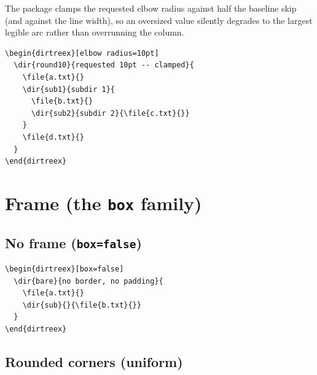 \documentclass[11pt]{article}
\begin{document}
The package clamps the requested elbow radius against half the baseline skip (and against the line width), so an oversized value silently degrades to the largest legible arc rather than overrunning the column.

\begin{Verbatim}
\begin{dirtreex}[elbow radius=10pt]
  \dir{round10}{requested 10pt -- clamped}{
    \file{a.txt}{}
    \dir{sub1}{subdir 1}{
      \file{b.txt}{}
      \dir{sub2}{subdir 2}{\file{c.txt}{}}
    }
    \file{d.txt}{}
  }
\end{dirtreex}
\end{Verbatim}

\begin{dirtreex}[elbow radius=10pt]
\end{dirtreex}

\clearpage

\section{Frame (the \texttt{box} family)}

\subsection{No frame (\texttt{box=false})}

\begin{Verbatim}
\begin{dirtreex}[box=false]
  \dir{bare}{no border, no padding}{
    \file{a.txt}{}
    \dir{sub}{}{\file{b.txt}{}}
  }
\end{dirtreex}
\end{Verbatim}

\begin{dirtreex}[box=false]
\end{dirtreex}

\subsection{Rounded corners (uniform)}
\end{document}
